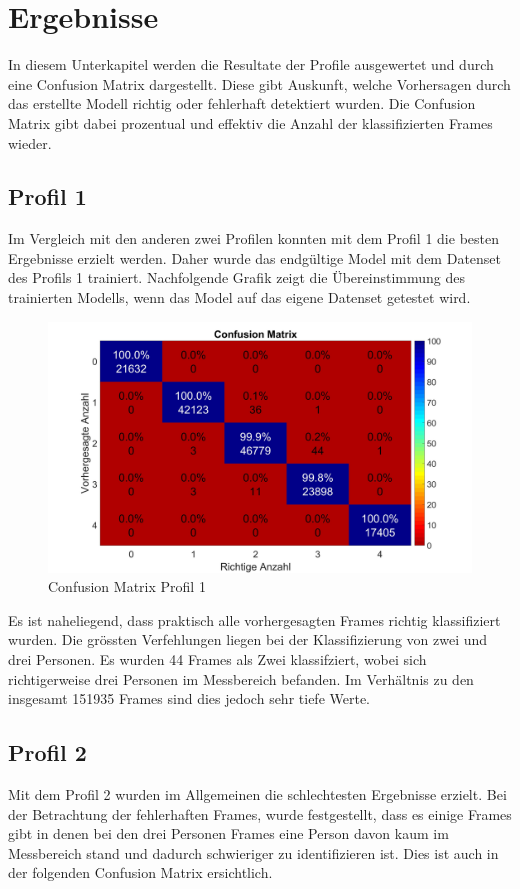 \section{Ergebnisse}
\label{sec:Ergebnisse}

In diesem Unterkapitel werden die Resultate der Profile ausgewertet und durch eine Confusion Matrix dargestellt. Diese gibt Auskunft, welche Vorhersagen durch das erstellte Modell richtig oder fehlerhaft detektiert wurden. Die Confusion Matrix gibt dabei prozentual und effektiv die Anzahl der klassifizierten Frames wieder. 


\subsection{Profil 1}
\label{subsec:Profil1}
Im Vergleich mit den anderen zwei Profilen konnten mit dem Profil 1 die besten Ergebnisse erzielt werden. Daher wurde das endgültige Model mit dem Datenset des Profils 1 trainiert. Nachfolgende Grafik zeigt die Übereinstimmung des trainierten Modells, wenn das Model auf das eigene Datenset getestet wird. 


\begin{figure}[H]
	\centering
	\label{fig:profil1}
	\includegraphics[width=0.55\linewidth]{fig/Profil_1m}
	\caption[Confusion Matrix Profil 1]{Confusion Matrix Profil 1}

\end{figure}

 Es ist naheliegend, dass praktisch alle vorhergesagten Frames richtig klassifiziert wurden. Die grössten Verfehlungen liegen bei der Klassifizierung von zwei und drei Personen. Es wurden 44 Frames als Zwei klassifziert, wobei sich richtigerweise drei Personen im Messbereich befanden. Im Verhältnis zu den insgesamt 151935 Frames sind dies jedoch sehr tiefe Werte.

\subsection{Profil 2}
\label{subsec:Profil2}
Mit dem Profil 2 wurden im Allgemeinen die schlechtesten Ergebnisse erzielt. Bei der Betrachtung der fehlerhaften Frames, wurde festgestellt, dass es einige Frames gibt in denen bei den drei Personen Frames eine Person davon kaum im Messbereich stand und dadurch schwieriger zu identifizieren ist. Dies ist auch in der folgenden Confusion Matrix ersichtlich.

